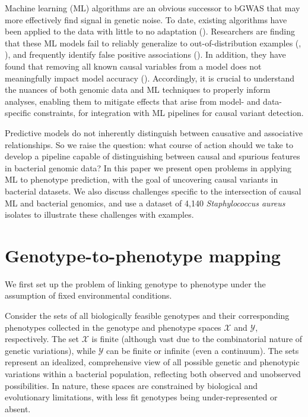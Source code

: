 \documentclass[12pt]{article}
\begin{document}
Machine learning (ML) algorithms are an obvious successor to bGWAS that may more effectively find signal in genetic noise. To date, existing algorithms have been applied to the data with little to no adaptation (\cite{wang2022practical, pearcy2021genome, deelder2019machine, shi2019antimicrobial}). Researchers are finding that these ML models fail to reliably generalize to out-of-distribution examples (\cite{chalka2023advantage}, \cite{hu2024assessing}), and frequently identify false positive associations (\cite{pearcy2021genome}). In addition, they have found that removing all known causal variables from a model does not meaningfully impact model accuracy (\cite{nguyen2018developing}). Accordingly, it is crucial to understand the nuances of both genomic data and ML techniques to properly inform analyses, enabling them to mitigate effects that arise from model- and data-specific constraints, for integration with ML pipelines for causal variant detection. 

Predictive models do not inherently distinguish between causative and associative relationships. So we raise the question: what course of action should we take to develop a pipeline capable of distinguishing between causal and spurious features in bacterial genomic data? In this paper we present open problems in applying ML to phenotype prediction, with the goal of uncovering causal variants in bacterial datasets. We also discuss challenges specific to the intersection of causal ML and bacterial genomics, and use a dataset of 4,140 \textit{Staphylococcus aureus} isolates to illustrate these challenges with examples. 


\section{Genotype-to-phenotype mapping} \label{Sec:GP_mapping}

We first set up the problem of linking genotype to phenotype under the assumption of fixed environmental conditions. 

Consider the sets of all biologically feasible genotypes and their corresponding phenotypes collected in the genotype and phenotype spaces $\mathcal{X}$ and $\mathcal{Y}$, respectively. The set $\mathcal{X}$ is finite (although vast due to the combinatorial nature of genetic variations), while $\mathcal{Y}$ can be finite or infinite (even a continuum). The sets represent an idealized, comprehensive view of all possible genetic and phenotypic variations within a bacterial population, reflecting both observed and unobserved possibilities. In nature, these spaces are constrained by biological and evolutionary limitations, with less fit genotypes being under-represented or absent. 
\end{document}
